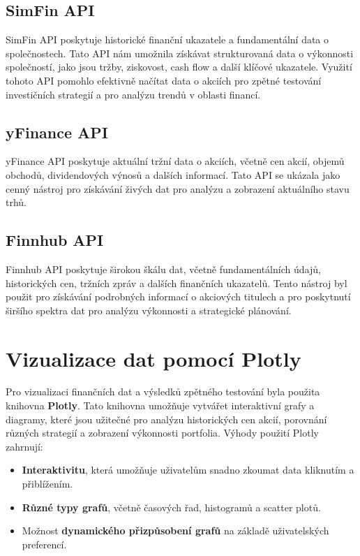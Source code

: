 \documentclass[12pt, a4paper]{report}
\begin{document}
\subsection{SimFin API}
SimFin API poskytuje historické finanční ukazatele a fundamentální data o společnostech. Tato API nám umožnila získávat strukturovaná data o výkonnosti společností, jako jsou tržby, ziskovost, cash flow a další klíčové ukazatele. Využití tohoto API pomohlo efektivně načítat data o akciích pro zpětné testování investičních strategií a pro analýzu trendů v oblasti financí.

\subsection{yFinance API}
yFinance API poskytuje aktuální tržní data o akciích, včetně cen akcií, objemů obchodů, dividendových výnosů a dalších informací. Tato API se ukázala jako cenný nástroj pro získávání živých dat pro analýzu a zobrazení aktuálního stavu trhů.

\subsection{Finnhub API}
Finnhub API poskytuje širokou škálu dat, včetně fundamentálních údajů, historických cen, tržních zpráv a dalších finančních ukazatelů. Tento nástroj byl použit pro získávání podrobných informací o akciových titulech a pro poskytnutí širšího spektra dat pro analýzu výkonnosti a strategické plánování.

\section{Vizualizace dat pomocí Plotly}
Pro vizualizaci finančních dat a výsledků zpětného testování byla použita knihovna \textbf{Plotly}. Tato knihovna umožňuje vytvářet interaktivní grafy a diagramy, které jsou užitečné pro analýzu historických cen akcií, porovnání různých strategií a zobrazení výkonnosti portfolia. Výhody použití Plotly zahrnují:
\begin{itemize}
    \item \textbf{Interaktivitu}, která umožňuje uživatelům snadno zkoumat data kliknutím a přiblížením.
    \item \textbf{Různé typy grafů}, včetně časových řad, histogramů a scatter plotů.
    \item Možnost \textbf{dynamického přizpůsobení grafů} na základě uživatelských preferencí.
\end{itemize}
\end{document}

